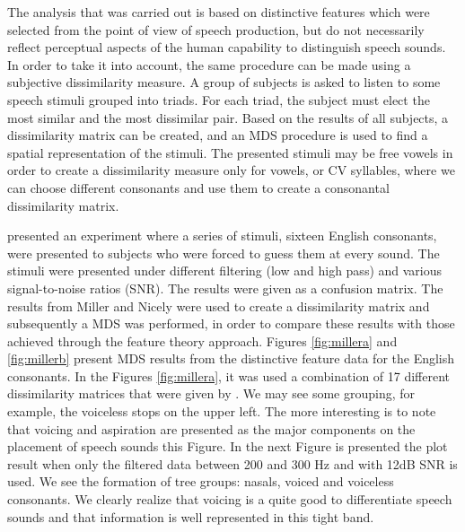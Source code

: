 The analysis that was carried out is based on distinctive features which were selected from the point of view of speech production, but do not necessarily reflect perceptual aspects of the human capability to distinguish speech sounds. In order to take it into account, the same procedure can be made using a subjective dissimilarity measure. A group of subjects is asked to listen to some speech stimuli grouped into triads. For each triad, the subject must elect the most similar and the most dissimilar pair. Based on the results of all subjects, a dissimilarity matrix can be created, and an MDS procedure is used to find a spatial representation of the stimuli. The presented stimuli may be free vowels in order to create a dissimilarity measure only for vowels, or CV syllables, where we can choose different consonants and use them to create a consonantal dissimilarity matrix.

\cite{miller1955} presented an experiment where a series of stimuli, sixteen English consonants, were presented to subjects who were forced to guess them at every sound. The stimuli were presented under different filtering (low and high pass) and various signal-to-noise ratios (SNR). The results were given as a confusion matrix. The results from Miller and Nicely were used to create a dissimilarity matrix and subsequently a MDS was performed, in order to compare these results with those achieved through the feature theory approach. Figures \ref{fig:millera} and \ref{fig:millerb} present MDS results from the distinctive feature data for the English consonants. 
In the Figures \ref{fig:millera}, it was used a combination of 17 different dissimilarity matrices that were given by \cite{miller1955}. We may see some grouping, for example, the voiceless stops on the upper left. The more interesting is to note that voicing and aspiration are presented as the major components on the placement of speech sounds this Figure. 
In the next Figure is presented the plot result when only the filtered data between 200 and 300 Hz and with 12dB SNR is used. We see the formation of tree groups: nasals, voiced and voiceless consonants. We clearly realize that voicing is a quite good to differentiate speech sounds and that information is well represented in this tight band.

